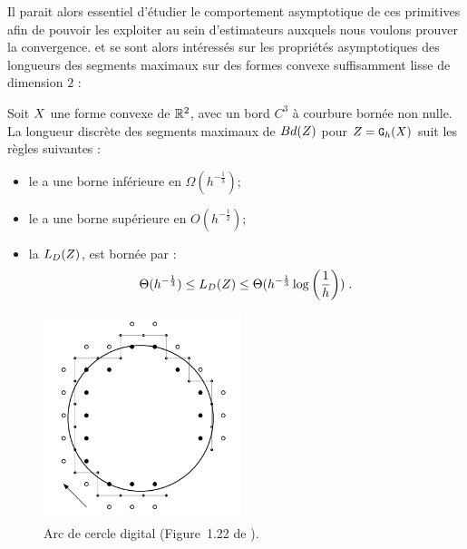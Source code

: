 Il parait alors essentiel d'étudier le comportement asymptotique de ces
primitives afin de pouvoir les exploiter au sein d'estimateurs auxquels nous
voulons prouver la convergence.  et
 se sont alors intéressés sur les
propriétés asymptotiques des longueurs des segments maximaux sur des formes
convexe suffisamment lisse de dimension $2$ :
%
\begin{lemma}{}
  \label{lem:law-length-MDSS}
  Soit $X$ une forme convexe de $\mathbb{R}^2$, avec un bord $C^3$ à
  courbure bornée non nulle. La longueur discrète des segments maximaux de
  $Bd({Z})$ pour $Z = \mathtt{G}_{h}(X)$ suit les règles suivantes :
  \begin{itemize}
    \item le  a une borne inférieure en
    $\Omega(h^{-\frac{1}{3}})$;
    \item le  a une borne supérieure en
    $O(h^{-\frac{1}{2}})$;
    \item la  $L_D({Z})$, est
    bornée par :
    \begin{equation}
      \label{eq:lengthMS}
      \Theta(h^{-\frac{1}{3}}) \le L_D( {Z} ) \le \Theta(h^{-\frac{1}{3}} \log \left(\frac{1}{h}\right))\;.
    \end{equation}
  \end{itemize}
\end{lemma}


\begin{figure}[ht]{
    \begin{center}
    \includegraphics[height=6cm]{images/Notions/DCA}
    \end{center}}
    \caption[Arc de cercle digital.]{Arc de cercle digital (Figure~1.22 de \cite{Roussillon2009}).\label{fig:dca-figure}}
\end{figure}


